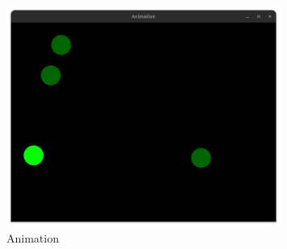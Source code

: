 \begin{figure}[ht]
    \centering
    \includegraphics[width=0.8\textwidth]{src/img/sfml_animation.png}
    \caption{Animation}
    \label{fig:animation}
\end{figure}

